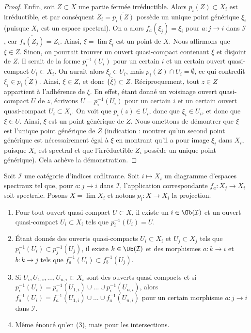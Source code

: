 \begin{proof}
\medskip\noindent
Enfin, soit $Z \subset X$ une partie fermée irréductible. Alors
$p_i(Z) \subset X_i$ est irréductible, et par conséquent
$Z_i = \overline{p_i(Z)}$ possède un unique point générique $\xi_i$
(puisque $X_i$ est un espace spectral). On a alors
$f_a(\xi_j) = \xi_i$ pour $a : j \to i$ dans $\mathcal{I}$, car
$\overline{f_a(Z_j)} = Z_i$. Ainsi, $\xi = \lim \xi_i$ est un point de $X$.
Nous affirmons que $\xi \in Z$. Sinon, on pourrait trouver un ouvert
quasi-compact contenant $\xi$ et disjoint de $Z$. Il serait de la forme
$p_i^{-1}(U_i)$ pour un certain $i$ et un certain ouvert quasi-compact
$U_i \subset X_i$. On aurait alors $\xi_i \in U_i$, mais
$p_i(Z) \cap U_i = \emptyset$, ce qui contredit
$\xi_i \in \overline{p_i(Z)}$. Ainsi, $\xi \in Z$, et donc
$\overline{\{\xi\}} \subset Z$. Réciproquement, tout $z \in Z$ appartient
à l'adhérence de $\xi$. En effet, étant donné un voisinage ouvert quasi-compact
$U$ de $z$, écrivons $U = p_i^{-1}(U_i)$ pour un certain $i$
et un certain ouvert quasi-compact $U_i \subset X_i$. On voit que
$p_i(z) \in U_i$, donc que $\xi_i \in U_i$, et donc que $\xi \in U$. Ainsi,
$\xi$ est un point générique de $Z$. Nous omettons de démontrer que $\xi$ est
l'unique point générique de $Z$ (indication : montrer qu'un second point
générique est nécessairement égal à $\xi$ en montrant qu'il a pour image
$\xi_i$ dans $X_i$, puisque $X_i$ est spectral et que l'irréductible $Z_i$
possède un unique point générique). Cela achève la démonstration.
\end{proof}

\begin{lemma}
\label{lemma-descend-opens}
Soit $\mathcal{I}$ une catégorie d'indices cofiltrante.
Soit $i \mapsto X_i$ un diagramme d'espaces spectraux tel
que, pour $a : j \to i$ dans $\mathcal{I}$, l'application correspondante
$f_a : X_j \to X_i$ soit spectrale. Posons $X = \lim X_i$ et notons
$p_i : X \to X_i$ la projection.
\begin{enumerate}
\item Pour tout ouvert quasi-compact $U \subset X$,
il existe un $i \in \Ob(\mathcal{I})$ et un ouvert quasi-compact
$U_i \subset X_i$ tels que $p_i^{-1}(U_i) = U$.
\item Étant donnés des ouverts quasi-compacts $U_i \subset X_i$ et
$U_j \subset X_j$ tels que $p_i^{-1}(U_i) \subset p_j^{-1}(U_j)$,
il existe $k \in \Ob(\mathcal{I})$ et des morphismes
$a : k \to i$ et $b : k \to j$ tels que
$f_a^{-1}(U_i) \subset f_b^{-1}(U_j)$.
\item Si $U_i, U_{1, i}, \ldots, U_{n, i} \subset X_i$ sont des ouverts
quasi-compacts et si
$p_i^{-1}(U_i) = p_i^{-1}(U_{1, i}) \cup \ldots \cup p_i^{-1}(U_{n, i})$,
alors
$f_a^{-1}(U_i) = f_a^{-1}(U_{1, i}) \cup \ldots \cup f_a^{-1}(U_{n, i})$
pour un certain morphisme $a : j \to i$ dans $\mathcal{I}$.
\item Même énoncé qu'en (3), mais pour les intersections.
\end{enumerate}
\end{lemma}


